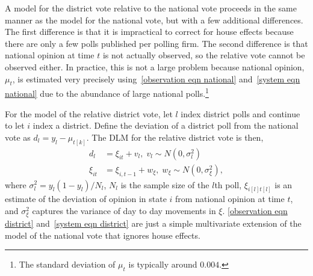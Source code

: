 \documentclass[12pt,final,fleqn]{article}
\theoremstyle{plain}
\begin{document}
A model for the district vote relative to the national vote proceeds in the same manner as the model for the national vote, but with a few additional differences. The first difference is that it is impractical to correct for house effects because there are only a few polls published per polling firm. The second difference is that national opinion at time $t$ is not actually observed, so the relative vote cannot be observed either. In practice, this is not a large problem because national opinion, $\mu_t$, is estimated very precisely using~\autoref{observation eqn national} and~\autoref{system eqn national} due to the abundance of large national polls.\footnote{The standard deviation of $\mu_t$ is typically around $0.004$.}

For the model of the relative district vote, let $l$ index district polls and continue to let $i$ index a district. Define the deviation of a district poll from the national vote as $d_l = y_l - \mu_{t[k]}$. The DLM for the relative district vote is then,
\begin{align}
\label{observation eqn district}
d_l &= \xi_{it} + v_l, \; v_l\sim N(0, \sigma^2_l)\\ 
\label{system eqn district}
\xi_{it} &= \xi_{i,t-1} + w_\xi, \; w_\xi \sim N(0, \sigma^2_{\xi}), 
\end{align}
where $\sigma^2_l = y_l(1-y_l)/N_l$, $N_l$ is the sample size of the $l$th poll, $\xi_{i[l]t[l]}$ is an estimate of the deviation of opinion in state $i$ from national opinion at time $t$, and $\sigma^2_{\xi}$ captures the variance of day to day movements in $\xi$. \autoref{observation eqn district} and~\autoref{system eqn district} are just a simple multivariate extension of the model of the national vote that ignores house effects.
\end{document}
